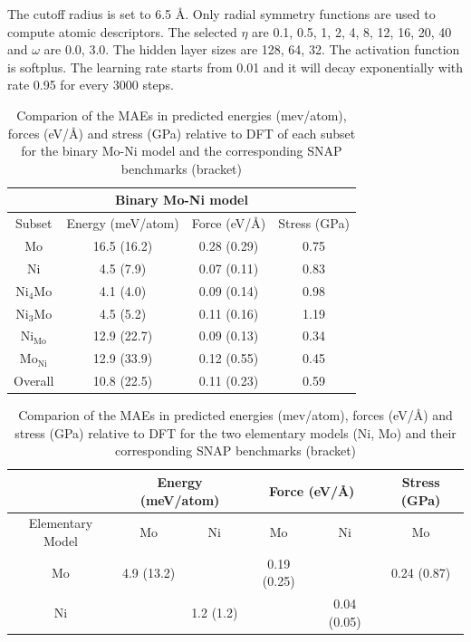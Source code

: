 \documentclass[final,1p,times]{elsarticle}
\begin{document}
The cutoff radius is set to 6.5 \AA. Only radial symmetry 
functions are used to compute atomic descriptors. The selected $\eta$ are 
0.1, 0.5, 1, 2, 4, 8, 12, 16, 20, 40 and $\omega$ are 0.0, 3.0. The hidden layer
sizes are 128, 64, 32. The activation function is softplus.
The learning rate starts from 0.01 and it will decay exponentially with rate 
0.95 for every 3000 steps.

% 
%
\begin{table}[h]
\centering
\begin{tabular}{cccc}
\hline
\multicolumn{4}{c}{Binary Mo-Ni model} \\
\hline
Subset & Energy (meV/atom) & Force (eV/\AA) & Stress (GPa) \\
\hline
Mo & 16.5 (16.2) & 0.28 (0.29) & 0.75 \\
Ni & 4.5 (7.9)   & 0.07 (0.11) & 0.83 \\
Ni$_4$Mo & 4.1 (4.0) & 0.09 (0.14) & 0.98 \\ 
Ni$_3$Mo & 4.5 (5.2) & 0.11 (0.16) & 1.19 \\
Ni$_{\mathrm{Mo}}$ & 12.9 (22.7) & 0.09 (0.13)& 0.34 \\
Mo$_{\mathrm{Ni}}$ & 12.9 (33.9) & 0.12 (0.55)& 0.45 \\
Overall & 10.8 (22.5)& 0.11 (0.23) & 0.59 \\
\hline
\end{tabular}
\caption{\label{table:MAE}
Comparion of the MAEs in predicted energies (mev/atom), forces (eV/\AA) and 
stress (GPa) relative to DFT of each subset for the binary Mo-Ni model and the
corresponding SNAP benchmarks (bracket)}
\end{table}

\begin{table}[h]
\centering
\begin{tabular}{ccc|cc|c}
\hline
  & \multicolumn{2}{c|}{Energy (meV/atom)} & \multicolumn{2}{c|}{Force (eV/\AA)}
  & Stress (GPa) \\
\hline
Elementary Model & Mo & Ni & Mo & Ni & Mo \\
\hline
Mo & 4.9 (13.2) & & 0.19 (0.25) & & 0.24 (0.87) \\
Ni & & 1.2 (1.2) & & 0.04 (0.05) & \\
\hline
\end{tabular}
\caption{\label{table:MAE1}
Comparion of the MAEs in predicted energies (mev/atom), forces (eV/\AA) and 
stress (GPa) relative to DFT for the two elementary models (Ni, Mo) and their
corresponding SNAP benchmarks (bracket)}
\end{table}
\end{document}
